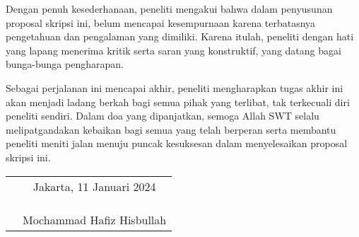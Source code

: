 Dengan penuh kesederhanaan, peneliti mengakui bahwa dalam penyusunan proposal skripsi 
ini, belum mencapai kesempurnaan karena terbatasnya pengetahuan dan pengalaman 
yang dimiliki. Karena itulah, peneliti dengan hati yang lapang menerima kritik 
serta saran yang konstruktif, yang datang bagai bunga-bunga pengharapan.

Sebagai perjalanan ini mencapai akhir, peneliti mengharapkan tugas akhir ini akan 
menjadi ladang berkah bagi semua pihak yang terlibat, tak terkecuali diri peneliti 
sendiri. Dalam doa yang dipanjatkan, semoga Allah SWT selalu melipatgandakan kebaikan 
bagi semua yang telah berperan serta membantu peneliti meniti jalan menuju puncak 
kesuksesan dalam menyelesaikan proposal skripsi ini.

\vspace{2cm}

\begin{tabular}{p{7.5cm}c}
	&Jakarta, 11 Januari 2024\\
	&\\
	&\\
	&\\
	&Mochammad Hafiz Hisbullah
\end{tabular}
